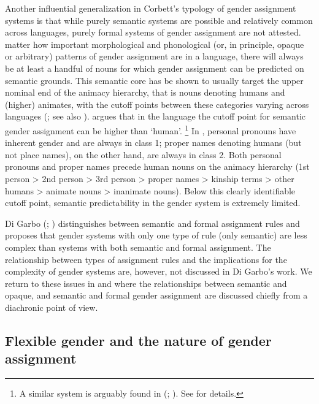\documentclass[output=collectionpaper]{langsci/langscibook}
\begin{document}
Another influential generalization in Corbett's typology of gender assignment systems is that while purely semantic systems are possible and relatively common across languages, purely formal systems of gender assignment are not attested.  matter how important morphological and phonological (or, in principle, opaque or arbitrary) patterns of gender assignment are in a language, there will always be at least a handful of nouns for which gender assignment can be predicted on semantic grounds. This semantic core has be shown to usually target the upper nominal end of the animacy hierarchy, that is nouns denoting humans and (higher) animates, with the cutoff points between these categories varying across languages (\citealt{Dahl2000a}; see also ).  argues that in the  language  the cutoff point for semantic gender assignment can be higher than `human'.%
\footnote{%
A similar system is arguably found in  (; ). See \cite[note 3, 591--592]{Dahl2000} for details.
} %
In , personal pronouns have inherent gender and are always in class 1; proper names denoting humans (but not place names), on the other hand, are always in class 2. Both personal pronouns and proper names precede human nouns on the animacy hierarchy (1st person > 2nd person > 3rd person > proper names > kinship terms > other humans > animate nouns > inanimate nouns). Below this clearly identifiable cutoff point, semantic predictability in the  gender system is extremely limited.

Di Garbo (\citealt*{DiGarbo2014}; \citealt*{DiGarbo2016}) distinguishes between semantic and formal assignment rules and proposes that gender systems with only one type of rule (only semantic) are less complex than systems with both semantic and formal assignment. The relationship between types of assignment rules and the implications for the complexity of gender systems are, however, not discussed in Di Garbo's work. We return to these issues in  and  where the relationships between semantic and opaque, and semantic and formal gender assignment are discussed chiefly from a diachronic point of view.

  \subsection{Flexible gender and the nature of gender assignment}
\label{sec:WDG:5.2}
\end{document}
